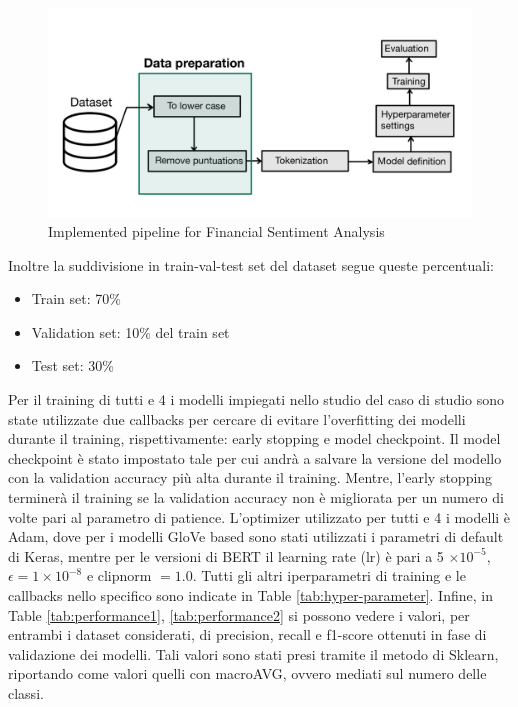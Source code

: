 \begin{figure}[!ht]
    \centering
    \includegraphics[width=12cm]{./images/pipeline.png}
    \caption{Implemented pipeline for Financial Sentiment Analysis}
    \label{fig:pipeline}
\end{figure}
\newpage
Inoltre la suddivisione in train-val-test set del dataset segue queste percentuali:
\begin{itemize}
    \item Train set: 70\%
    \item Validation set: 10\% del train set
    \item Test set: 30\%
\end{itemize}
Per il training di tutti e 4 i modelli impiegati nello studio del caso di studio sono state utilizzate due callbacks per cercare di evitare l'overfitting dei modelli durante il training, rispettivamente: early stopping e model checkpoint. Il model checkpoint  è stato impostato tale per cui andrà a salvare la versione del modello con la validation accuracy più alta durante il training. Mentre, l'early stopping terminerà il training se la validation accuracy non è migliorata per un numero di volte pari al parametro di patience.
L'optimizer utilizzato per tutti e 4 i modelli è Adam, dove per i modelli GloVe based sono stati utilizzati i parametri di default di Keras, mentre per le versioni di BERT il learning rate (lr) è pari a 5 $\times 10^{-5}$, $\epsilon = 1 \times 10^{-8}$ e clipnorm $= 1.0$.
Tutti gli altri iperparametri di training e le callbacks nello specifico sono indicate in Table \ref{tab:hyper-parameter}.
\newline
Infine, in Table \ref{tab:performance1}, \ref{tab:performance2} si possono vedere i valori, per entrambi i dataset considerati, di precision, recall e f1-score ottenuti in fase di validazione dei modelli. Tali valori sono stati presi tramite il metodo  di Sklearn, riportando come valori quelli con macroAVG, ovvero mediati sul numero delle classi. 


